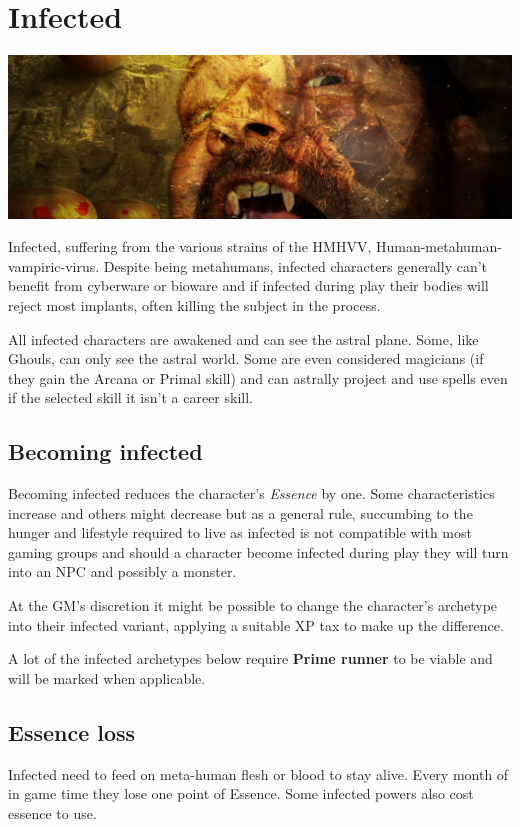 \documentclass{book}
\begin{document}
\section{Infected}
\begin{center}
	\includegraphics[width=1\linewidth]{images/piqsels.com-id-znuch}
\end{center}
\begin{multicols}{2}
Infected, suffering from the various strains of the HMHVV, Human-metahuman-vampiric-virus. Despite being metahumans, infected characters generally can't benefit from cyberware or bioware and if infected during play their bodies will reject most implants, often killing the subject in the process. 

All infected characters are awakened and can see the astral plane. Some, like Ghouls, can only see the astral world. Some are even considered magicians (if they gain the Arcana or Primal skill) and can astrally project and use spells even if the selected skill it isn't a career skill. 

\subsection{Becoming infected}
\label{sec:gettinginfected}
Becoming infected reduces the character's \textit{Essence} by one. Some characteristics increase and others might decrease but as a general rule, succumbing to the hunger and lifestyle required to live as infected is not compatible with most gaming groups and should a character become infected during play they will turn into an NPC and possibly a monster.

At the GM's discretion it might be possible to change the character's archetype into their infected variant, applying a suitable XP tax to make up the difference.

A lot of the infected archetypes below require \textbf{Prime runner} to be viable and will be marked when applicable. 

\subsection{Essence loss}
\label{sec:essenseloss}
Infected need to feed on meta-human flesh or blood to stay alive. Every month of in game time they lose one point of Essence. Some infected powers also cost essence to use. 


\end{multicols}
\end{document}
